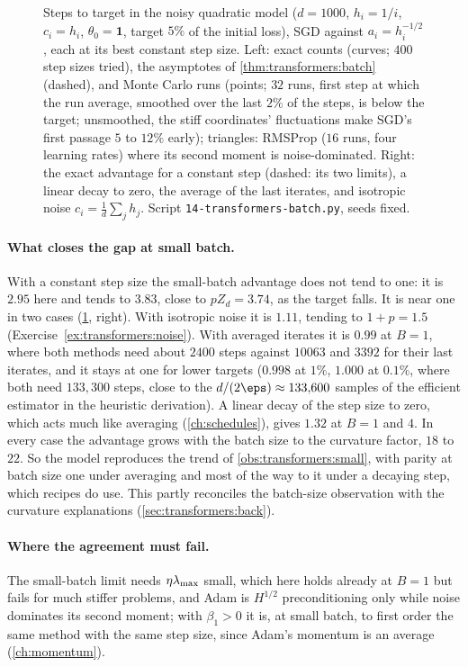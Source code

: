 \begin{refsection}
\begin{figure}[t]
\begin{fullwidth}
\end{fullwidth}
\caption{Steps to target in the noisy quadratic model ($d=1000$, $h_i=1/i$, $c_i=h_i$, $\theta_0=\mathbf1$, target $5\%$ of the initial loss), SGD against $a_i=h_i^{-1/2}$, each at its best constant step size. Left: exact counts (curves; $400$ step sizes tried), the asymptotes of \cref{thm:transformers:batch} (dashed), and Monte Carlo runs (points; $32$ runs, first step at which the run average, smoothed over the last $2\%$ of the steps, is below the target; unsmoothed, the stiff coordinates' fluctuations make SGD's first passage $5$ to $12\%$ early); triangles: RMSProp ($16$ runs, four learning rates) where its second moment is noise-dominated. Right: the exact advantage for a constant step (dashed: its two limits), a linear decay to zero, the average of the last iterates, and isotropic noise $c_i=\frac1d\sum_jh_j$. Script \texttt{14-transformers-batch.py}, seeds fixed.}
\label{fig:transformers:batch}
\end{figure}

\paragraph{What closes the gap at small batch.} With a constant step size the small-batch advantage does not tend to one: it is $2.95$ here and tends to $3.83$, close to $pZ_d=3.74$, as the target falls. It is near one in two cases (\cref{fig:transformers:batch}, right). With isotropic noise it is $1.11$, tending to $1+p=1.5$ (Exercise~\ref{ex:transformers:noise}). With averaged iterates it is $0.99$ at $B=1$, where both methods need about $2400$ steps against $10063$ and $3392$ for their last iterates, and it stays at one for lower targets ($0.998$ at $1\%$, $1.000$ at $0.1\%$, where both need $133{,}300$ steps, close to the $d/(2\eps)\approx133{,}600$ samples of the efficient estimator in the heuristic derivation). A linear decay of the step size to zero, which acts much like averaging (\cref{ch:schedules}), gives $1.32$ at $B=1$ and $4$. In every case the advantage grows with the batch size to the curvature factor, $18$ to $22$. So the model reproduces the trend of \cref{obs:transformers:small}, with parity at batch size one under averaging and most of the way to it under a decaying step, which recipes do use. This partly reconciles the batch-size observation with the curvature explanations (\cref{sec:transformers:back}).

\paragraph{Where the agreement must fail.} The small-batch limit needs $\eta\lambda_{\max}$ small, which here holds already at $B=1$ but fails for much stiffer problems, and Adam is $H^{1/2}$ preconditioning only while noise dominates its second moment; with $\beta_1>0$ it is, at small batch, to first order the same method with the same step size, since Adam's momentum is an average (\cref{ch:momentum}).


\end{refsection}
